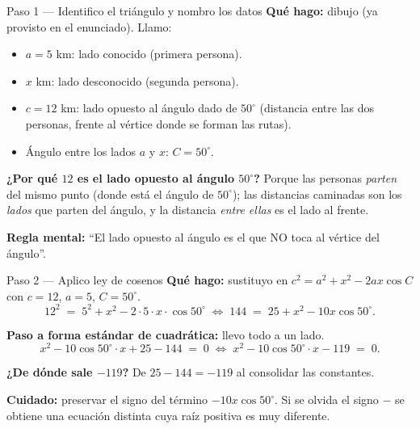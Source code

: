 \documentclass[11pt]{article}
\begin{document}
\begin{paso}{Paso 1 --- Identifico el triángulo y nombro los datos}
\textbf{Qué hago:} dibujo (ya provisto en el enunciado). Llamo:
\begin{itemize}[leftmargin=*]
  \item $a=5$ km: lado conocido (primera persona).
  \item $x$ km: lado desconocido (segunda persona).
  \item $c=12$ km: lado opuesto al ángulo dado de $50^\circ$ (distancia entre las dos personas, frente al vértice donde se forman las rutas).
  \item Ángulo entre los lados $a$ y $x$: $C=50^\circ$.
\end{itemize}

\textbf{¿Por qué $12$ es el lado opuesto al ángulo $50^\circ$?} Porque las personas \emph{parten} del mismo punto (donde está el ángulo de $50^\circ$); las distancias caminadas son los \emph{lados} que parten del ángulo, y la distancia \emph{entre ellas} es el lado al frente.

\textbf{Regla mental:} ``El lado opuesto al ángulo es el que NO toca al vértice del ángulo''.
\end{paso}

\begin{paso}{Paso 2 --- Aplico ley de cosenos}
\textbf{Qué hago:} sustituyo en $c^2=a^2+x^2-2ax\cos C$ con $c=12$, $a=5$, $C=50^\circ$.
\[
12^2 \;=\; 5^2+x^2-2\cdot 5\cdot x\cdot\cos 50^\circ
\;\Longleftrightarrow\; 144 \;=\; 25+x^2-10x\cos 50^\circ.
\]

\textbf{Paso a forma estándar de cuadrática:} llevo todo a un lado.
\[
x^2 - 10\cos 50^\circ\cdot x + 25 - 144 \;=\; 0 \;\Longleftrightarrow\; x^2 - 10\cos 50^\circ\cdot x - 119 \;=\; 0.
\]

\textbf{¿De dónde sale $-119$?} De $25-144=-119$ al consolidar las constantes.

\textbf{Cuidado:} preservar el signo del término $-10x\cos 50^\circ$. Si se olvida el signo $-$ se obtiene una ecuación distinta cuya raíz positiva es muy diferente.
\end{paso}
\end{document}
